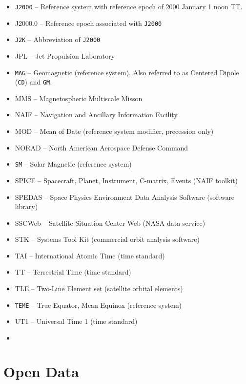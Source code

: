 \documentclass[draft]{agujournal2019}
\begin{document}
\begin{itemize}
\item  \texttt{J2000} -- Reference system with reference epoch of 2000 January 1 noon TT.
\item J2000.0 -- Reference epoch associated with  \texttt{J2000}
\item  \texttt{J2K} -- Abbreviation of  \texttt{J2000}
\item JPL -- Jet Propulsion Laboratory
\item  \texttt{MAG} -- Geomagnetic (reference system). Also referred to as Centered Dipole (\texttt{CD}) and \texttt{GM}.
\item MMS -- Magnetospheric Multiscale Misson 
\item NAIF -- Navigation and Ancillary Information Facility 
\item MOD -- Mean of Date (reference system modifier, precession only)
\item NORAD -- North American Aerospace Defense Command
\item  \texttt{SM} -- Solar Magnetic (reference system)
\item SPICE -- Spacecraft, Planet, Instrument, C-matrix, Events (NAIF toolkit)
\item SPEDAS -- Space Physics Environment Data Analysis Software (software library)
\item SSCWeb -- Satellite Situation Center Web (NASA data service)
\item STK -- Systems Tool Kit (commercial orbit analysis software)
\item TAI -- International Atomic Time (time standard)
\item TT -- Terrestrial Time (time standard)
\item TLE -- Two-Line Element set (satellite orbital elements)
\item  \texttt{TEME} -- True Equator, Mean Equinox (reference system)
\item UT1 -- Universal Time 1 (time standard)
\item {}
\end{itemize}

\section*{Open Data}

\end{document}
